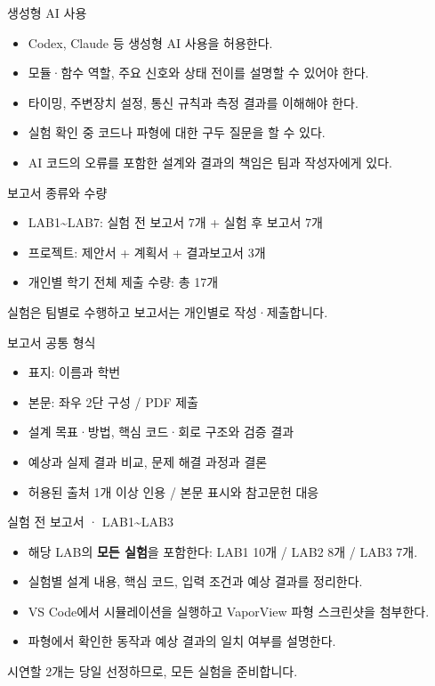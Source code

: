 \documentclass[aspectratio=169,11pt,t]{beamer}
\begin{document}
\begin{frame}{생성형 AI 사용}
\begin{itemize}
\item Codex, Claude 등 생성형 AI 사용을 허용한다.
\item 모듈·함수 역할, 주요 신호와 상태 전이를 설명할 수 있어야 한다.
\item 타이밍, 주변장치 설정, 통신 규칙과 측정 결과를 이해해야 한다.
\item 실험 확인 중 코드나 파형에 대한 구두 질문을 할 수 있다.
\item AI 코드의 오류를 포함한 설계와 결과의 책임은 팀과 작성자에게 있다.
\end{itemize}
\end{frame}

\begin{frame}{보고서 종류와 수량}
\begin{itemize}
\item LAB1\textasciitilde{}LAB7: 실험 전 보고서 7개 + 실험 후 보고서 7개
\item 프로젝트: 제안서 + 계획서 + 결과보고서 3개
\item 개인별 학기 전체 제출 수량: 총 17개
\end{itemize}
\vspace{0.35cm}
실험은 팀별로 수행하고 보고서는 개인별로 작성·제출합니다.
\end{frame}

\begin{frame}{보고서 공통 형식}
\begin{itemize}
\item 표지: 이름과 학번
\item 본문: 좌우 2단 구성 / PDF 제출
\item 설계 목표·방법, 핵심 코드·회로 구조와 검증 결과
\item 예상과 실제 결과 비교, 문제 해결 과정과 결론
\item 허용된 출처 1개 이상 인용 / 본문 표시와 참고문헌 대응
\end{itemize}
\end{frame}

\begin{frame}{실험 전 보고서 · LAB1\textasciitilde{}LAB3}
\begin{itemize}
\item 해당 LAB의 \textbf{모든 실험}을 포함한다: LAB1 10개 / LAB2 8개 / LAB3 7개.
\item 실험별 설계 내용, 핵심 코드, 입력 조건과 예상 결과를 정리한다.
\item VS Code에서 시뮬레이션을 실행하고 VaporView 파형 스크린샷을 첨부한다.
\item 파형에서 확인한 동작과 예상 결과의 일치 여부를 설명한다.
\end{itemize}
\vspace{0.25cm}
시연할 2개는 당일 선정하므로, 모든 실험을 준비합니다.
\end{frame}
\end{document}
